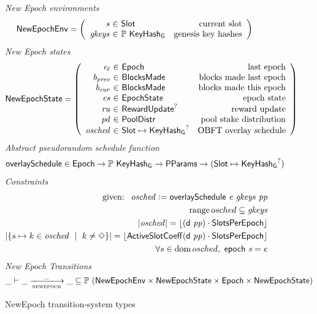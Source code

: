 \begin{figure}
  \emph{New Epoch environments}
  \begin{equation*}
    \NewEpochEnv =
    \left(
      \begin{array}{r@{~\in~}lr}
        \var{s} & \Slot & \text{current slot} \\
        \var{gkeys} & \powerset{\KeyHashGen} & \text{genesis key hashes} \\
      \end{array}
    \right)
  \end{equation*}
  \emph{New Epoch states}
  \begin{equation*}
    \NewEpochState =
    \left(
      \begin{array}{r@{~\in~}lr}
        \var{e_\ell} & \Epoch & \text{last epoch} \\
        \var{b_{prev}} & \BlocksMade & \text{blocks made last epoch} \\
        \var{b_{cur}} & \BlocksMade & \text{blocks made this epoch} \\
        \var{es} & \EpochState & \text{epoch state} \\
        \var{ru} & \RewardUpdate^? & \text{reward update} \\
        \var{pd} & \PoolDistr & \text{pool stake distribution} \\
        \var{osched} & \Slot\mapsto\KeyHashGen^? & \text{OBFT overlay schedule} \\
      \end{array}
    \right)
  \end{equation*}
  \emph{Abstract pseudorandom schedule function}
  \begin{align*}
    & \mathsf{overlaySchedule} \in \mathsf{Epoch} \to \mathbb{P}~\mathsf{KeyHash_G} \to \mathsf{PParams}
        \to (\mathsf{Slot}\mapsto\mathsf{KeyHash_G}^?) \\
  \end{align*}
  \emph{Constraints}
  \begin{align*}
    \text{ given: }~\mathit{osched}\mathrel{\mathop:}=\mathsf{overlaySchedule}~\mathit{e}~\mathit{gkeys}~\mathit{pp} \\
    \operatorname{range}{osched}\subseteq\mathit{gkeys} \\
    |\mathit{osched}| = \lfloor(\mathsf{d}~\mathit{pp})\cdot\mathsf{SlotsPerEpoch}\rfloor \\
    |\{s\mapsto k\in\mathit{osched}~\mid~k\neq\Diamond\}| =
    \lfloor\mathsf{ActiveSlotCoeff}(\mathsf{d}~\mathit{pp})\cdot\mathsf{SlotsPerEpoch}\rfloor \\
    \forall s\in\operatorname{dom}{osched},~\mathsf{epoch}~\mathit{s}=e\\
  \end{align*}
  \emph{New Epoch Transitions}
  \begin{equation*}
    \_ \vdash \var{\_} \trans{newepoch}{\_} \var{\_} \subseteq
    \powerset (\NewEpochEnv \times \NewEpochState \times \Epoch \times \NewEpochState)
  \end{equation*}
  \caption{NewEpoch transition-system types}
  \label{fig:ts-types:newepoch}
\end{figure}

